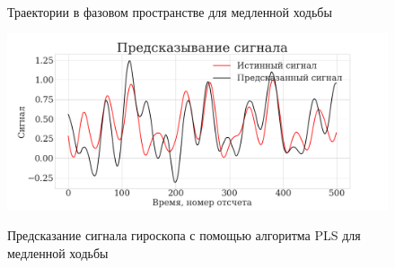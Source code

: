 \documentclass[12pt]{extarticle}
\begin{document}
\begin{figure}[h!]
\centering
  \wspace{0.5cm}
  \\
\caption{Траектории в фазовом пространстве для медленной ходьбы}
\label{fg:long_traj}
\end{figure}

\begin{figure}[h!]
\centering
{\includegraphics[width=1.1\textwidth]{./images/long_pls_new.png}}
\caption{Предсказание сигнала гироскопа с помощью алгоритма PLS для медленной ходьбы}
\label{fg:long_pred}
\end{figure}
\end{document}
